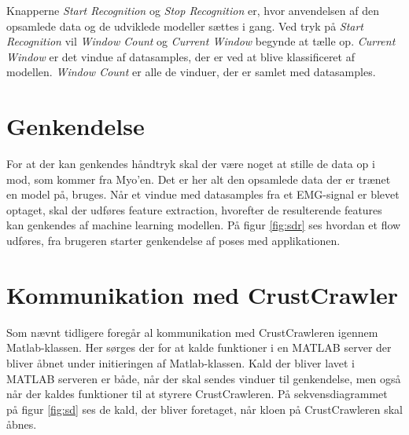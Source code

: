 Knapperne \textit{Start Recognition} og \textit{Stop Recognition} er, hvor anvendelsen af den opsamlede data og de udviklede modeller sættes i gang. Ved tryk på \textit{Start Recognition} vil \textit{Window Count} og \textit{Current Window} begynde at tælle op. \textit{Current Window} er det vindue af datasamples, der er ved at blive klassificeret af modellen. \textit{Window Count} er alle de vinduer, der er samlet med datasamples.

\section{Genkendelse}
For at der kan genkendes håndtryk skal der være noget at stille de data op i mod, som kommer fra Myo'en. Det er her alt den opsamlede data der er trænet en model på, bruges. Når et vindue med datasamples fra et EMG-signal er blevet optaget, skal der udføres feature extraction, hvorefter de resulterende features kan genkendes af machine learning modellen. På figur \ref{fig:sdr} ses hvordan et flow udføres, fra brugeren starter genkendelse af poses med applikationen.



\section{Kommunikation med CrustCrawler}
\label{sec:ktc}
Som nævnt tidligere foregår al kommunikation med CrustCrawleren igennem Matlab-klassen. Her sørges der for at kalde funktioner i en MATLAB server der bliver åbnet under initieringen af Matlab-klassen. Kald der bliver lavet i MATLAB serveren er både, når der skal sendes vinduer til genkendelse, men også når der kaldes funktioner til at styrere CrustCrawleren. På sekvensdiagrammet på figur \ref{fig:sd} ses de kald, der bliver foretaget, når kloen på CrustCrawleren skal åbnes.

